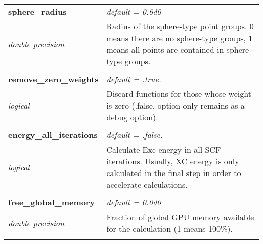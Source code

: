 \begin{Spacing}{1.0}
\begin{longtable}{ p{} p{} }
      \textbf{sphere\_radius}
      &  \textit{default = 0.6d0}
      \\*\textit{double precision}
      & Radius of the sphere-type point groups. 0 means there are no sphere-type
      groups, 1 means all points are contained in sphere-type groups.\\* \\
   
      \textbf{remove\_zero\_weights}
      &  \textit{default = .true. }
      \\*\textit{logical}
      & Discard functions for those whose weight is zero
      (.false. option only remains as a debug option).
      \\* \\
   
      \textbf{energy\_all\_iterations}
      &  \textit{default = .false. }
      \\*\textit{logical}
      & Calculate Exc energy in all SCF iterations. Usually, XC energy is only
      calculated in the final step in order to accelerate calculations. \\* \\
   
      \textbf{free\_global\_memory}
      &  \textit{default = 0.0d0}
      \\*\textit{double precision}
      & Fraction of global GPU memory available for the calculation
      (1 means 100\%).\\* \\
   
   
   \end{longtable}
   \end{Spacing}
